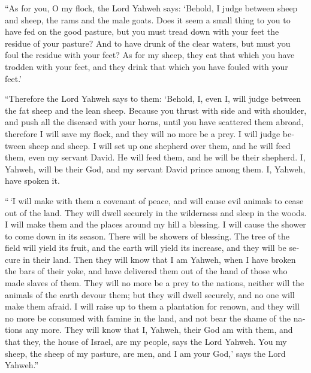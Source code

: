 \begin{paracol}{2}
\begin{otherlanguage}{english}
 ``As for you, O my flock, the Lord Yahweh says: `Behold,
I judge between sheep and sheep, the rams and the male goats.
 Does it seem a small thing to you to have fed on the
good pasture, but you must tread down with your feet the residue of your
pasture? And to have drunk of the clear waters, but must you foul the
residue with your feet?  As for my sheep, they eat that
which you have trodden with your feet, and they drink that which you
have fouled with your feet.'

 ``Therefore the Lord Yahweh says to them: `Behold, I,
even I, will judge between the fat sheep and the lean sheep.
 Because you thrust with side and with shoulder, and push
all the diseased with your horns, until you have scattered them abroad,
 therefore I will save my flock, and they will no more be
a prey. I will judge between sheep and sheep.  I will set
up one shepherd over them, and he will feed them, even my servant David.
He will feed them, and he will be their shepherd.  I,
Yahweh, will be their God, and my servant David prince among them. I,
Yahweh, have spoken it.

 ``\,`I will make with them a covenant of peace, and will
cause evil animals to cease out of the land. They will dwell securely in
the wilderness and sleep in the woods.  I will make them
and the places around my hill a blessing. I will cause the shower to
come down in its season. There will be showers of blessing.
 The tree of the field will yield its fruit, and the
earth will yield its increase, and they will be secure in their land.
Then they will know that I am Yahweh, when I have broken the bars of
their yoke, and have delivered them out of the hand of those who made
slaves of them.  They will no more be a prey to the
nations, neither will the animals of the earth devour them; but they
will dwell securely, and no one will make them afraid.  I
will raise up to them a plantation for renown, and they will no more be
consumed with famine in the land, and not bear the shame of the nations
any more.  They will know that I, Yahweh, their God am
with them, and that they, the house of Israel, are my people, says the
Lord Yahweh.  You my sheep, the sheep of my pasture, are
men, and I am your God,' says the Lord Yahweh.''

\end{otherlanguage}


\end{paracol}

